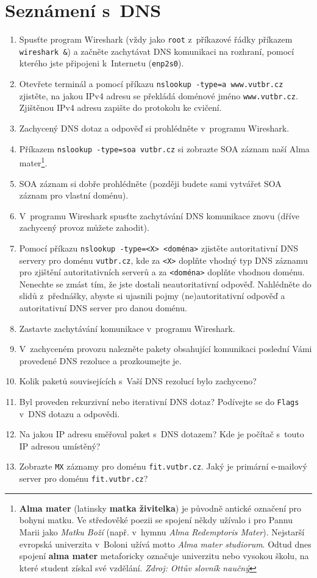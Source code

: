 \section{Seznámení s~DNS}
\begin{enumerate}
    \item Spusťte program Wireshark (vždy jako \texttt{root} z~příkazové řádky příkazem \texttt{wireshark \&}) a začněte zachytávat DNS komunikaci na rozhraní, pomocí kterého jste připojeni k~Internetu (\texttt{enp2s0}).
    \item Otevřete terminál a pomocí příkazu \texttt{nslookup -type=a www.vutbr.cz} zjistěte, na jakou IPv4 adresu se překládá doménové jméno \texttt{www.vutbr.cz}. Zjištěnou IPv4 adresu zapište do protokolu ke cvičení.
    \item Zachycený DNS dotaz a odpověď si prohlédněte v~programu Wireshark.
    \item Příkazem \texttt{nslookup -type=soa vutbr.cz} si zobrazte SOA záznam naší Alma mater\footnote{\textbf{Alma mater} (latinsky \textbf{matka živitelka}) je původně antické označení pro bohyni matku. Ve středověké poezii se spojení někdy užívalo i pro Pannu Marii jako \emph{Matku Boží} (např. v~hymnu \emph{Alma Redemptoris Mater}). Nejstarší evropská univerzita v~Boloni užívá motto \emph{Alma mater studiorum}. Odtud dnes spojení \textbf{alma mater} metaforicky označuje univerzitu nebo vysokou školu, na které student získal své vzdělání. \emph{Zdroj: Ottův slovník naučný}}.
    \item SOA záznam si dobře prohlédněte (později budete sami vytvářet SOA záznam pro vlastní doménu).
    \item V~programu Wireshark spusťte zachytávání DNS komunikace znovu (dříve zachycený provoz můžete zahodit).
    \item Pomocí příkazu \texttt{nslookup -type=<X> <doména>} zjistěte autoritativní DNS servery pro doménu \texttt{vutbr.cz}, kde za \texttt{<X>} doplňte vhodný typ DNS záznamu pro zjištění autoritativních serverů a za \texttt{<doména>} doplňte vhodnou doménu. Nenechte se zmást tím, že jste dostali neautoritativní odpověď. Nahlédněte do slidů z~přednášky, abyste si ujasnili pojmy (ne)autoritativní odpověď a autoritativní DNS server pro danou doménu.
    \item Zastavte zachytávání komunikace v~programu Wireshark.
    \item V~zachyceném provozu nalezněte pakety obsahující komunikaci poslední Vámi provedené DNS rezoluce a prozkoumejte je.
    \item Kolik paketů souvisejících s~Vaší DNS rezolucí bylo zachyceno?
    \item Byl proveden rekurzivní nebo iterativní DNS dotaz? Podívejte se do \texttt{Flags} v~DNS dotazu a odpovědi.
    \item Na jakou IP adresu směřoval paket s~DNS dotazem? Kde je počítač s~touto IP adresou umístěný?
    \item Zobrazte \texttt{MX} záznamy pro doménu \texttt{fit.vutbr.cz}. Jaký je primární e-mailový server pro doménu \texttt{fit.vutbr.cz}?
\end{enumerate}


